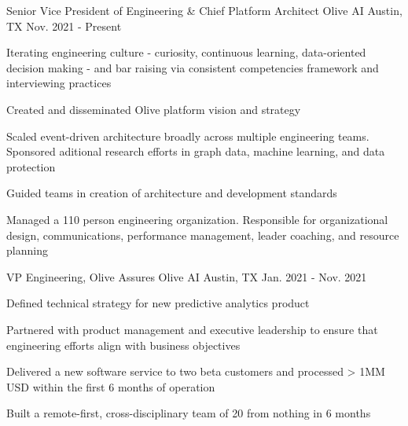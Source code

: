 


\begin{cventries}


\cventry
{Senior Vice President of Engineering \& Chief Platform Architect}
{Olive AI}
{Austin, TX}
{Nov. 2021 - Present}
{
  \begin{cvitems}
    \item{Iterating engineering culture - curiosity, continuous learning, data-oriented decision making - and bar raising via consistent competencies framework and interviewing practices}
    \item{Created and disseminated Olive platform vision and strategy}
    \item{Scaled event-driven architecture broadly across multiple engineering teams. Sponsored aditional research efforts in graph data, machine learning, and data protection}
    \item{Guided teams in creation of architecture and development standards}
    \item{Managed a 110 person engineering organization. Responsible for organizational design, communications, performance management, leader coaching, and resource planning}
  \end{cvitems}
}
    

\cventry
{VP Engineering, Olive Assures}
{Olive AI}
{Austin, TX}
{Jan. 2021 - Nov. 2021}
{
  \begin{cvitems}
    \item {Defined technical strategy for new predictive analytics product}
    \item {Partnered with product management and executive leadership to ensure that engineering efforts align with business objectives}
    \item {Delivered a new software service to two beta customers and processed > 1MM USD within the first 6 months of operation}
    \item {Built a remote-first, cross-disciplinary team of 20 from nothing in 6 months}
  \end{cvitems}
}


\end{cventries}

